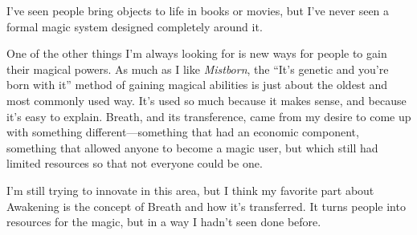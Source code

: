 I’ve seen people bring objects to life in books or movies, but I’ve never seen a formal magic system designed completely around it.

One of the other things I’m always looking for is new ways for people to gain their magical powers. As much as I like \textit{Mistborn}, the “It’s genetic and you’re born with it” method of gaining magical abilities is just about the oldest and most commonly used way. It’s used so much because it makes sense, and because it’s easy to explain. Breath, and its transference, came from my desire to come up with something different—something that had an economic component, something that allowed anyone to become a magic user, but which still had limited resources so that not everyone could be one.

I’m still trying to innovate in this area, but I think my favorite part about Awakening is the concept of Breath and how it’s transferred. It turns people into resources for the magic, but in a way I hadn’t seen done before.



